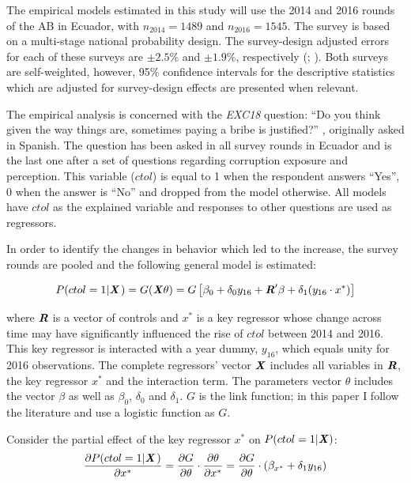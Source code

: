 \documentclass[12pt,a4]{article}\usepackage[]{graphicx}\usepackage[]{xcolor}
\begin{document}
The empirical models estimated in this study will use the 2014 and 2016 rounds of the AB in Ecuador, with $n_{2014}=1489$ and $n_{2016}= 1545$. The survey is based on a multi-stage national probability design. The survey-design adjusted errors for each of these surveys are $\pm 2.5\%$ and $\pm 1.9\%$, respectively (\cite{LAPOP.2014}; \cite{LAPOP.2017}). Both surveys are self-weighted, however, 95\% confidence intervals for the descriptive statistics which are adjusted for survey-design effects are presented when relevant. 

The empirical analysis is concerned with the \emph{EXC18} question: \enquote{Do you think given the way things are, sometimes paying a bribe is justified?} \parencite[p.96]{Moscoso.2018}, originally asked in Spanish. The question has been asked in all survey rounds in Ecuador and is the last one after a set of questions regarding corruption exposure and perception. This variable ($ctol$) is equal to 1 when the respondent answers \enquote{Yes}, 0 when the answer is \enquote{No} and dropped from the model otherwise. All models have $ctol$ as the explained variable and responses to other questions are used as regressors. 

In order to identify the changes in behavior which led to the increase, the survey rounds are pooled and the following general model is estimated: 

\begin{equation}
\label{eqn:genmod}
P(ctol = 1 | \textbf{\textit{X}} \hspace{0.04cm}) = G (\textbf{\textit{X}} \theta ) = G \left[ \beta_0 + \delta_0 y_{16} + \textbf{\textit{R}}'\beta + \delta_1 (y_{16} \cdot x^*) \right]
\end{equation}

where $\textbf{\textit{R}}$ is a vector of controls and $x^*$ is a key regressor whose change across time may have significantly influenced the rise of $ctol$ between 2014 and 2016. This key regressor is interacted with a year dummy, $y_{16}$, which equals unity for 2016 observations. The complete regressors' vector $\textbf{\textit{X}}$ includes all variables in $\textbf{\textit{R}}$, the key regressor $x^*$ and the interaction term. The parameters vector $\theta$ includes the vector $\beta$ as well as $\beta_0$, $\delta_0$ and $\delta_1$. $G$ is the link function; in this paper I follow the literature and use a logistic function as $G$. 

Consider the partial effect of the key regressor $x^*$ on $P(ctol =1| \textbf{\textit{X}})$:
\begin{equation}
\label{eqn:keype}
\dfrac{\partial P(ctol = 1 | \textbf{\textit{X}} \hspace{0.04cm})}{\partial x^*} = \dfrac{\partial G}{\partial \theta} \cdot 
\dfrac{\partial \theta}{\partial x^*} = \dfrac{\partial G}{\partial \theta} \cdot (\beta_{x^*}+ \delta_1 y_{16})
\end{equation}
\end{document}
